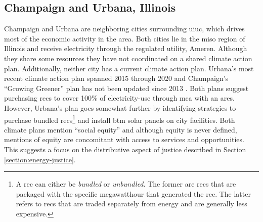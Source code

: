 \subsection{Champaign and Urbana, Illinois}
Champaign and Urbana are neighboring cities surrounding \ac{uiuc}, which drives
most of the economic activity in the area. Both cities lie in the \ac{miso}
region of Illinois and receive electricity through the regulated utility,
Ameren. Although they share some resources they have not coordinated on a shared
climate action plan. Additionally, neither city has a current climate action
plan. Urbana's most recent climate action plan spanned 2015 through 2020
\cite{ryan_climate_2014} and Champaign's ``Growing Greener'' plan has not been
updated since 2013 \cite{knight_champaign_2013}. Both plans suggest purchasing
\acp{rec} to cover 100\% of electricity-use through \ac{mca} with an \ac{ares}.
However, Urbana's plan goes somewhat further by identifying strategies to
purchase bundled \acp{rec}\footnote{A \ac{rec} can either be \textit{bundled} or
\textit{unbundled}. The former are \acp{rec} that are packaged with the specific
megawatthour that generated the \ac{rec}. The latter refers to \acp{rec} that
are traded separately from energy and are generally less expensive.} and install
\ac{btm} solar panels on city facilities. Both climate plans mention ``social
equity'' and although equity is never defined, mentions of equity are
concomitant with access to services and opportunities. This suggests a focus on
the distributive aspect of justice described in Section
\ref{section:energy-justice}.

